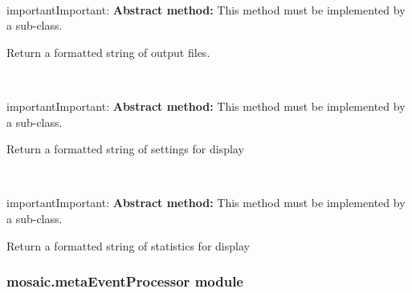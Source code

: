 \documentclass[letterpaper,10pt,english]{sphinxmanual}
\begin{document}
\begin{fulllineitems}
\begin{fulllineitems}
\end{fulllineitems}


\begin{fulllineitems}
\label{api-doc/mosaic.meta:mosaic.metaEventPartition.metaEventPartition.formatoutputfiles}~
\begin{notice}{important}{Important:}
\textbf{Abstract method:} This method must be implemented by a sub-class.
\end{notice}

Return a formatted string of output files.

\end{fulllineitems}


\begin{fulllineitems}
\label{api-doc/mosaic.meta:mosaic.metaEventPartition.metaEventPartition.formatsettings}~
\begin{notice}{important}{Important:}
\textbf{Abstract method:} This method must be implemented by a sub-class.
\end{notice}

Return a formatted string of settings for display

\end{fulllineitems}


\begin{fulllineitems}
\label{api-doc/mosaic.meta:mosaic.metaEventPartition.metaEventPartition.formatstats}~
\begin{notice}{important}{Important:}
\textbf{Abstract method:} This method must be implemented by a sub-class.
\end{notice}

Return a formatted string of statistics for display

\end{fulllineitems}


\end{fulllineitems}



\subsubsection{mosaic.metaEventProcessor module}
\label{api-doc/mosaic.meta:mosaic-metaeventprocessor-module}
\end{document}
